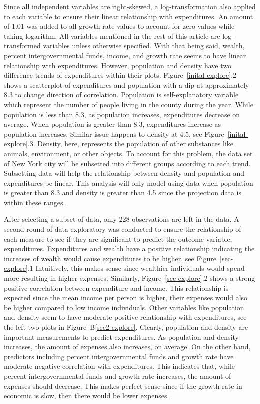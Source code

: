 \documentclass[11pt]{article}\usepackage[]{graphicx}\usepackage[]{color}
\begin{document}
\noindent Since all independent variables are right-skewed, a log-transformation also applied to each variable to ensure their linear relationship with expenditures. An amount of 1.01 was added to all growth rate values to account for zero values while taking logarithm. All variables mentioned in the rest of this article are log-transformed variables unless otherwise specified. With that being said, wealth, percent intergovernmental funds, income, and growth rate seems to have linear relationship with expenditures. However, population and density have two difference trends of expenditures within their plots. Figure~\ref{inital-explore}.2 shows a scatterplot of expenditures and population with a dip at approximately 8.3 to change direction of correlation. Population is self-explanatory variable which represent the number of people living in the county during the year. While population is less than 8.3, as population increases, expenditures decrease on average. When population is greater than 8.3, expenditures increase as population increases. Similar issue happens to density at 4.5, see Figure~\ref{inital-explore}.3. Density, here, represents the population of other substances like animals, environment, or other objects. To account for this problem, the data set of New York city will be subsetted into different groups according to each trend. Subsetting data will help the relationship between density and population and expenditures be linear. This analysis will only model using data when population is greater than 8.3 and density is greater than 4.5 since the projection data is within these ranges.    
\hfill \break



\noindent After selecting a subset of data, only 228 observations are left in the data. A second round of data exploratory was conducted to ensure the relationship of each measure to see if they are significant to predict the outcome variable, expenditures. Expenditures and wealth have a positive relationship indicating the increases of wealth would cause expenditures to be higher, see Figure~\ref{sec-explore}.1 Intuitively, this makes sense since wealthier individuals would spend more resulting in higher expenses. Similarly, Figure~\ref{sec-explore}.2 shows a strong positive correlation between expenditure and income. This relationship is expected since the mean income per person is higher, their expenses would also be higher compared to low income individuals. Other variables like population and density seem to have moderate positive relationship with expenditures, see the left two plots in Figure~B\ref{sec2-explore}. Clearly, population and density are important measurements to predict expenditures. As population and density increases, the amount of expenses also increases, on average. On the other hand, predictors including percent intergovernmental funds and growth rate have moderate negative correlation with expenditures. This indicates that, while percent intergovernmental funds and growth rate increases, the amount of expenses should decrease. This makes perfect sense since if the growth rate in economic is slow, then there would be lower expenses.             
\end{document}
